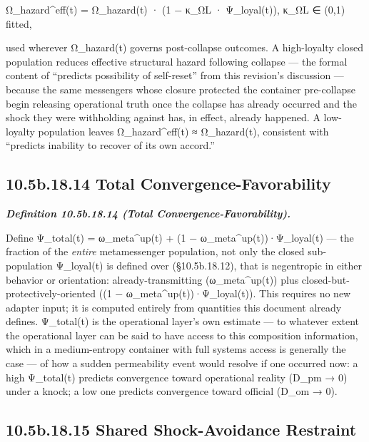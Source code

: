\documentclass[
]{article}
\begin{document}
Ω\_hazard\^{}eff(t) = Ω\_hazard(t) · (1 − κ\_ΩL · Ψ\_loyal(t)), κ\_ΩL ∈
(0,1) fitted,

used wherever Ω\_hazard(t) governs post-collapse outcomes. A
high-loyalty closed population reduces effective structural hazard
following collapse --- the formal content of ``predicts possibility of
self-reset'' from this revision's discussion --- because the same
messengers whose closure protected the container pre-collapse begin
releasing operational truth once the collapse has already occurred and
the shock they were withholding against has, in effect, already
happened. A low-loyalty population leaves Ω\_hazard\^{}eff(t) ≈
Ω\_hazard(t), consistent with ``predicts inability to recover of its own
accord.''

\hypertarget{b.18.14-total-convergence-favorability}{%
\subsection{10.5b.18.14 Total
Convergence-Favorability}\label{b.18.14-total-convergence-favorability}}

\emph{\textbf{Definition 10.5b.18.14 (Total Convergence-Favorability).}}

Define Ψ\_total(t) = ω\_meta\^{}up(t) + (1 −
ω\_meta\^{}up(t))·Ψ\_loyal(t) --- the fraction of the \emph{entire}
metamessenger population, not only the closed sub-population Ψ\_loyal(t)
is defined over (§10.5b.18.12), that is negentropic in either behavior
or orientation: already-transmitting (ω\_meta\^{}up(t)) plus
closed-but-protectively-oriented ((1 − ω\_meta\^{}up(t))·Ψ\_loyal(t)).
This requires no new adapter input; it is computed entirely from
quantities this document already defines. Ψ\_total(t) is the operational
layer's own estimate --- to whatever extent the operational layer can be
said to have access to this composition information, which in a
medium-entropy container with full systems access is generally the case
--- of how a sudden permeability event would resolve if one occurred
now: a high Ψ\_total(t) predicts convergence toward operational reality
(D\_pm → 0) under a knock; a low one predicts convergence toward
official (D\_om → 0).

\hypertarget{b.18.15-shared-shock-avoidance-restraint}{%
\subsection{10.5b.18.15 Shared Shock-Avoidance
Restraint}\label{b.18.15-shared-shock-avoidance-restraint}}
\end{document}
